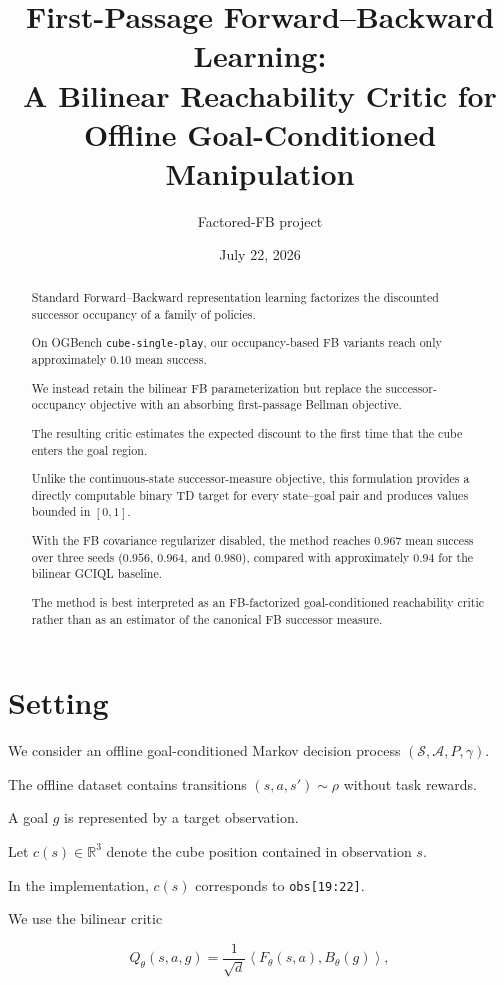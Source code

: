 \documentclass[11pt]{article}
\title{First-Passage Forward--Backward Learning:\\A Bilinear Reachability Critic for Offline Goal-Conditioned Manipulation}
\author{Factored-FB project}
\date{July 22, 2026}
\newcommand{\R}{\mathbb{R}}
\newcommand{\inner}[2]{\left\langle #1,#2\right\rangle}
\theoremstyle{remark}
\begin{document}
\maketitle

\begin{abstract}

Standard Forward--Backward representation learning factorizes the discounted successor occupancy of a family of policies.

On OGBench \texttt{cube-single-play}, our occupancy-based FB variants reach only approximately $0.10$ mean success.

We instead retain the bilinear FB parameterization but replace the successor-occupancy objective with an absorbing first-passage Bellman objective.

The resulting critic estimates the expected discount to the first time that the cube enters the goal region.

Unlike the continuous-state successor-measure objective, this formulation provides a directly computable binary TD target for every state--goal pair and produces values bounded in $[0,1]$.

With the FB covariance regularizer disabled, the method reaches $0.967$ mean success over three seeds ($0.956$, $0.964$, and $0.980$), compared with approximately $0.94$ for the bilinear GCIQL baseline.

The method is best interpreted as an FB-factorized goal-conditioned reachability critic rather than as an estimator of the canonical FB successor measure.

\end{abstract}

\section{Setting}

We consider an offline goal-conditioned Markov decision process $(\mathcal S,\mathcal A,P,\gamma)$.

The offline dataset contains transitions $(s,a,s')\sim\rho$ without task rewards.

A goal $g$ is represented by a target observation.

Let $c(s)\in\R^3$ denote the cube position contained in observation $s$.

In the implementation, $c(s)$ corresponds to \texttt{obs[19:22]}.

We use the bilinear critic

\begin{equation}
Q_\theta(s,a,g)=\frac{1}{\sqrt d}\inner{F_\theta(s,a)}{B_\theta(g)},
\label{eq:bilinear}
\end{equation}
\end{document}
